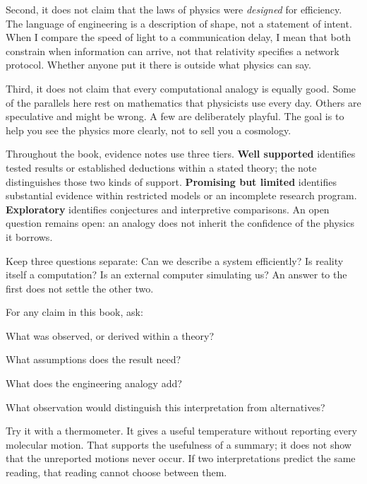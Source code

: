 Second, it does not claim that the laws of physics were \emph{designed} for efficiency. The language of engineering is a description of shape, not a statement of intent. When I compare the speed of light to a communication delay, I mean that both constrain when information can arrive, not that relativity specifies a network protocol. Whether anyone put it there is outside what physics can say.

Third, it does not claim that every computational analogy is equally good. Some of the parallels here rest on mathematics that physicists use every day. Others are speculative and might be wrong. A few are deliberately playful. The goal is to help you see the physics more clearly, not to sell you a cosmology.

\begin{researchnotebox}
Throughout the book, evidence notes use three tiers. \textbf{Well supported} identifies tested results or established deductions within a stated theory; the note distinguishes those two kinds of support. \textbf{Promising but limited} identifies substantial evidence within restricted models or an incomplete research program. \textbf{Exploratory} identifies conjectures and interpretive comparisons. An open question remains open: an analogy does not inherit the confidence of the physics it borrows.
\end{researchnotebox}

\begin{quickpracticebox}
Keep three questions separate: Can we describe a system efficiently? Is reality itself a computation? Is an external computer simulating us? An answer to the first does not settle the other two.

For any claim in this book, ask:
\begin{compactchecklist}
\item What was observed, or derived within a theory?
\item What assumptions does the result need?
\item What does the engineering analogy add?
\item What observation would distinguish this interpretation from alternatives?
\end{compactchecklist}
Try it with a thermometer. It gives a useful temperature without reporting every molecular motion. That supports the usefulness of a summary; it does not show that the unreported motions never occur. If two interpretations predict the same reading, that reading cannot choose between them.
\end{quickpracticebox}

